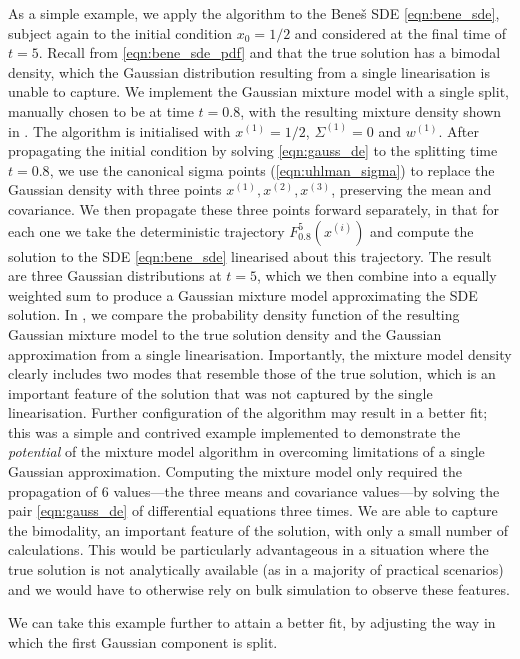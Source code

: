 As a simple example, we apply the algorithm to the Bene\v{s} SDE \cref{eqn:bene_sde}, subject again to the initial condition \(x_0 = 1/2\) and considered at the final time of \(t = 5\).
Recall from \cref{eqn:bene_sde_pdf} and  that the true solution has a bimodal density, which the Gaussian distribution resulting from a single linearisation is unable to capture.
We implement the Gaussian mixture model with a single split, manually chosen to be at time \(t = 0.8\), with the resulting mixture density shown in .
The algorithm is initialised with \(x^{(1)} = 1/2\), \(\Sigma^{(1)} = 0\) and \(w^{(1)}\).
After propagating the initial condition by solving \cref{eqn:gauss_de} to the splitting time \(t = 0.8\), we use the canonical sigma points (\cref{eqn:uhlman_sigma}) to replace the Gaussian density with three points \(x^{(1)}, x^{(2)}, x^{(3)}\), preserving the mean and covariance.
We then propagate these three points forward separately, in that for each one we take the deterministic trajectory \(F_{0.8}^{5}\!\left(x^{(i)}\right)\) and compute the solution to the SDE \cref{eqn:bene_sde} linearised about this trajectory.
The result are three Gaussian distributions at \(t = 5\), which we then combine into a equally weighted sum to produce a Gaussian mixture model approximating the SDE solution.
In , we compare the probability density function of the resulting Gaussian mixture model to the true solution density and the Gaussian approximation from a single linearisation.
Importantly, the mixture model density clearly includes two modes that resemble those of the true solution, which is an important feature of the solution that was not captured by the single linearisation.
Further configuration of the algorithm may result in a better fit; this was a simple and contrived example implemented to demonstrate the \emph{potential} of the mixture model algorithm in overcoming limitations of a single Gaussian approximation.
Computing the mixture model only required the propagation of 6 values---the three means and covariance values---by solving the pair \cref{eqn:gauss_de} of differential equations three times.
We are able to capture the bimodality, an important feature of the solution, with only a small number of calculations.
This would be particularly advantageous in a situation where the true solution is not analytically available (as in a majority of practical scenarios) and we would have to otherwise rely on bulk simulation to observe these features.

We can take this example further to attain a better fit, by adjusting the way in which the first Gaussian component is split.

